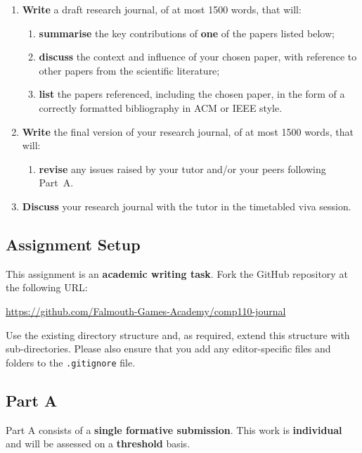 \documentclass{../../fal_assignment}
\begin{document}
\begin{enumerate}[label=(\Alph*)]
    \item \textbf{Write} a draft research journal, of at most 1500 words, that will:
    	\begin{enumerate}[label=(\roman*)]
    		\item \textbf{summarise} the key contributions of \textbf{one} of the papers listed below;
    		\item \textbf{discuss} the context and influence of your chosen paper, with reference to other
    			papers from the scientific literature;
    		\item \textbf{list} the papers referenced, including the chosen paper,
    			in the form of a correctly formatted bibliography in ACM or IEEE style.
    	\end{enumerate}
    \item \textbf{Write} the final version of your research journal, of at most 1500 words, that will:
    	\begin{enumerate}[label=(\roman*)]
    		\item \textbf{revise} any issues raised by your tutor and/or your peers following Part~A.
    	\end{enumerate}
    \item \textbf{Discuss} your research journal with the tutor in the timetabled viva session.
\end{enumerate}

\subsection*{Assignment Setup}

This assignment is an \textbf{academic writing task}. Fork the GitHub repository at the following URL:

\indent \url{https://github.com/Falmouth-Games-Academy/comp110-journal}

Use the existing directory structure and, as required, extend this structure with sub-directories.
Please also ensure that you add any editor-specific files and folders to the \texttt{.gitignore} file.

\subsection*{Part A}

Part A consists of a \textbf{single formative submission}. This work is \textbf{individual} and will be assessed on a \textbf{threshold} basis.
\end{document}
